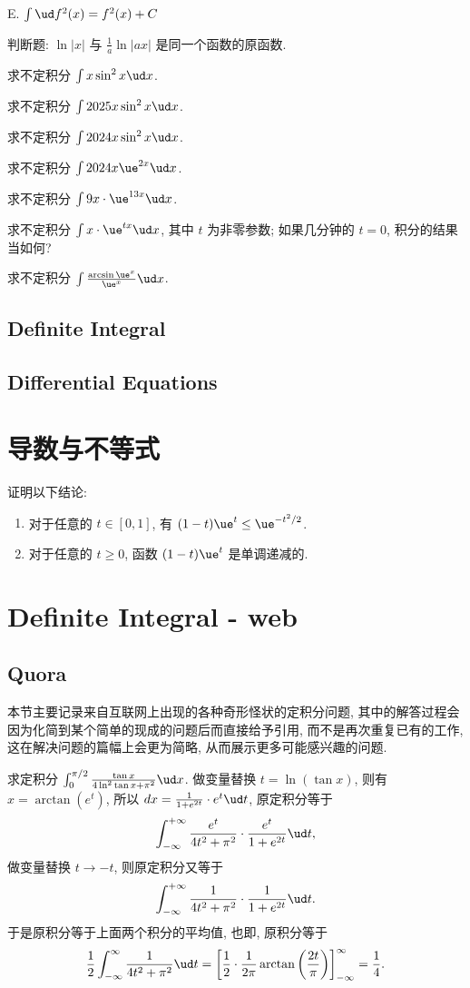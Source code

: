 E. $\int\ud f^2(x)=f^2(x)+C$
\eq

\bq{}{}
判断题: $\ln|x|$ 与 $\frac1a\ln|ax|$ 是同一个函数的原函数.
\eq

\bq{}{}
求不定积分 $\int x\sin^2x\ud x$.
\eq

\bq{}{}
求不定积分 $\int 2025x\sin^2 x\ud x$.
\eq

\bq{}{}
求不定积分 $\int 2024x\sin^2 x\ud x$.
\eq

\bq{}{}
求不定积分 $\int 2024x\ue^{2x}\ud x$.
\eq

\bq{}{}
求不定积分 $\int 9x\cdot\ue^{13x}\ud x$.
\eq

\bq{}{}
求不定积分 $\int x\cdot\ue^{t x}\ud x$, 其中 $t$ 为非零参数; 如果几分钟的 $t=0$, 积分的结果当如何?
\eq

\bq{}{}
求不定积分 $\int\frac{\arcsin\ue^x}{\ue^x}\ud x$.
\eq

\subsection{ Definite Integral }
\subsection{ Differential Equations }
\section{导数与不等式}
证明以下结论:

\begin{enumerate}[1.]
	\item 对于任意的 $t\in[0,1]$, 有 $(1-t)\ue^{t}\le\ue^{-t^{2}/2}$.
	\item 对于任意的 $t\ge0$, 函数 $(1-t)\ue^{t}$ 是单调递减的.
\end{enumerate}
\eq
\section{ Definite Integral - web }
\subsection{ Quora }

本节主要记录来自互联网上出现的各种奇形怪状的定积分问题, 其中的解答过程会因为化简到某个简单的现成的问题后而直接给予引用, 而不是再次重复已有的工作, 这在解决问题的篇幅上会更为简略, 从而展示更多可能感兴趣的问题.

求定积分 $\int_{0}^{\pi/2}\frac{\tan x}{4\ln^{2}\tan x+\pi^{2}}\ud x$.
\eq
\ba
做变量替换 $t=\ln\left(\tan x\right)$, 则有 $x=\arctan\left(e^{t}\right)$,
所以 $dx=\frac{1}{1+e^{2t}}\cdot e^{t}\ud t$, 原定积分等于
\[
\int_{-\infty}^{+\infty}\frac{e^{t}}{4t^{2}+\pi^{2}}\cdot\frac{e^{t}}{1+e^{2t}}\ud t,
\]
做变量替换 $t\longrightarrow-t$, 则原定积分又等于
\[
\int_{-\infty}^{+\infty}\frac{1}{4t^{2}+\pi^{2}}\cdot\frac{1}{1+e^{2t}}\ud t.
\]
于是原积分等于上面两个积分的平均值, 也即, 原积分等于
\[
\frac{1}{2}\int_{-\infty}^{\infty}\frac{1}{4t^{2}+\pi^{2}}\ud t=\left[\frac{1}{2}\cdot\frac{1}{2\pi}\arctan\left(\frac{2t}{\pi}\right)\right]_{-\infty}^{\infty}=\frac{1}{4}.
\]
\ea
